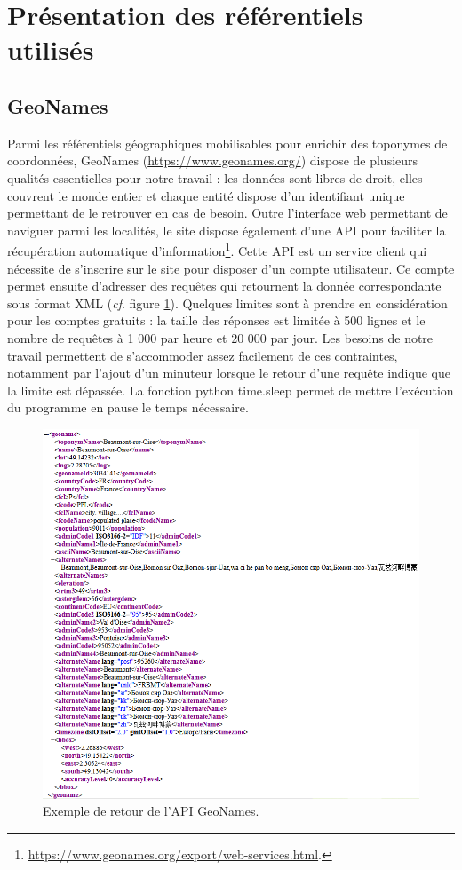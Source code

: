 \documentclass[a4paper,12pt,twoside]{book}
\begin{document}
	\section{Présentation des référentiels utilisés}
	
	\subsection{GeoNames}
	
	Parmi les référentiels géographiques mobilisables pour enrichir des toponymes de coordonnées, GeoNames (\url{https://www.geonames.org/}) dispose de plusieurs qualités essentielles pour notre travail : les données sont libres de droit, elles couvrent le monde entier et chaque entité dispose d'un identifiant unique permettant de le retrouver en cas de besoin. Outre l'interface web permettant de naviguer parmi les localités, le site dispose également d'une API pour faciliter la récupération automatique d'information\footnote{\url{https://www.geonames.org/export/web-services.html}.}. Cette API est un service client qui nécessite de s'inscrire sur le site pour disposer d'un compte utilisateur. Ce compte permet ensuite d'adresser des requêtes qui retournent la donnée correspondante sous format XML (\textit{cf}. figure \ref{API_geonames}). Quelques limites sont à prendre en considération pour les comptes gratuits : la taille des réponses est limitée à 500 lignes et le nombre de requêtes à 1 000 par heure et 20 000 par jour. Les besoins de notre travail permettent de s'accommoder assez facilement de ces contraintes, notamment par l'ajout d'un minuteur lorsque le retour d'une requête indique que la limite est dépassée. La fonction python \og time.sleep\fg{} permet de mettre l'exécution du programme en pause le temps nécessaire.
	
	
	\begin{figure}
		\centering
		\includegraphics[width=\textwidth]{Images/Result_geonames.png}
		\caption{Exemple de retour de l'API GeoNames.}
		\label{API_geonames}
	\end{figure}
	
\end{document}
